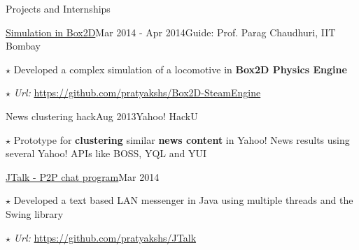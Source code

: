 \documentclass{resume2} %
\begin{document}
\begin{rSection}{Projects and Internships}
\begin{rSubsection}{\href{https://github.com/pratyakshs/Box2D-SteamEngine}{Simulation in Box2D}}{Mar 2014 - Apr 2014}{Guide: Prof. Parag Chaudhuri, IIT Bombay}{}
\item[$\star$] Developed a complex simulation of a locomotive in \textbf{Box2D Physics Engine} 
\item[$\star$] \emph{Url:} \url{https://github.com/pratyakshs/Box2D-SteamEngine}

\end{rSubsection}




\clearpage

\begin{rSubsection}{News clustering hack}{Aug 2013}{Yahoo! HackU}{}
\item[$\star$] Prototype for \textbf{clustering} similar \textbf{news content} in Yahoo! News results using several Yahoo! APIs like BOSS, YQL and YUI
\end{rSubsection}



\begin{rSubsection}{\href{https://github.com/pratyakshs/JTalk}{JTalk - P2P chat program}}{Mar 2014}{}{}
\item[$\star$] Developed a text based LAN messenger in Java using multiple threads and the Swing library
\item[$\star$] \emph{Url:} \url{https://github.com/pratyakshs/JTalk}
\end{rSubsection}


\end{rSection}
\end{document}
